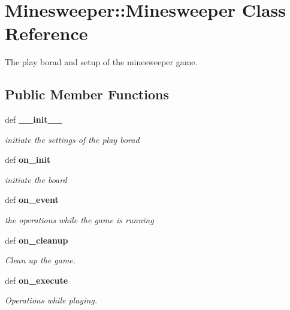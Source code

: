 \section{Minesweeper::Minesweeper Class Reference}
\label{classMinesweeper_1_1Minesweeper}
The play borad and setup of the minesweeper game.  


\subsection*{Public Member Functions}
\begin{CompactItemize}
\item 
def \bf{\_\-\_\-init\_\-\_\-}
\begin{CompactList}\small\item\em initiate the settings of the play borad \item\end{CompactList}\item 
def \bf{on\_\-init}
\begin{CompactList}\small\item\em initiate the board \item\end{CompactList}\item 
def \bf{on\_\-event}
\begin{CompactList}\small\item\em the operations while the game is running \item\end{CompactList}\item 
def \bf{on\_\-cleanup}
\begin{CompactList}\small\item\em Clean up the game. \item\end{CompactList}\item 
def \bf{on\_\-execute}
\begin{CompactList}\small\item\em Operations while playing. \item\end{CompactList}\end{CompactItemize}
